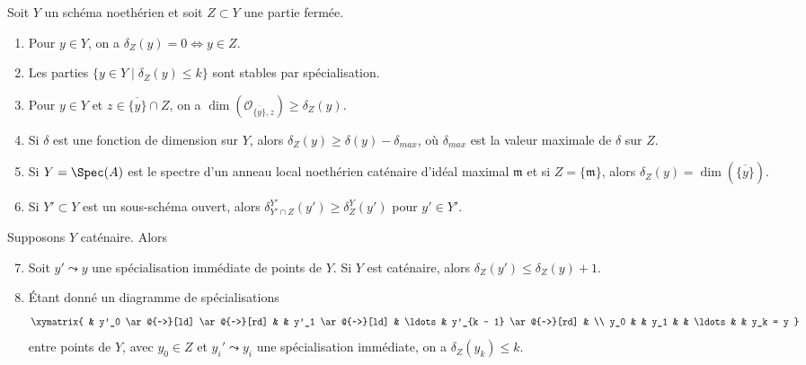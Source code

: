 \begin{lemma}
\label{lemma-discussion}
Soit $Y$ un schéma noethérien et soit $Z \subset Y$ une partie fermée.
\begin{enumerate}
\item Pour $y \in Y$, on a $\delta_Z(y) = 0 \Leftrightarrow y \in Z$.
\item Les parties $\{y \in Y \mid \delta_Z(y) \leq k\}$ sont
stables par spécialisation.
\item Pour $y \in Y$ et $z \in \overline{\{y\}} \cap Z$, on a
$\dim(\mathcal{O}_{\overline{\{y\}}, z}) \geq \delta_Z(y)$.
\item Si $\delta$ est une fonction de dimension sur $Y$, alors
$\delta_Z(y) \geq \delta(y) - \delta_{max}$, où $\delta_{max}$
est la valeur maximale de $\delta$ sur $Z$.
\item Si $Y = \Spec(A)$ est le spectre d'un anneau local noethérien caténaire
d'idéal maximal $\mathfrak m$ et si $Z = \{\mathfrak m\}$, alors
$\delta_Z(y) = \dim(\overline{\{y\}})$.
\item Si $Y' \subset Y$ est un sous-schéma ouvert, alors
$\delta^{Y'}_{Y' \cap Z}(y') \geq \delta^Y_Z(y')$ pour $y' \in Y'$.
\end{enumerate}
Supposons $Y$ caténaire. Alors
\begin{enumerate}
\setcounter{enumi}{6}
\item Soit $y' \leadsto y$ une spécialisation immédiate de points de $Y$.
Si $Y$ est caténaire, alors $\delta_Z(y') \leq \delta_Z(y) + 1$.
\item Étant donné un diagramme de spécialisations
$$
\xymatrix{
& y'_0 \ar@{~>}[ld] \ar@{~>}[rd] &
& y'_1 \ar@{~>}[ld] & \ldots
& y'_{k - 1} \ar@{~>}[rd] &
\\
y_0 & &
y_1 & &
\ldots & &
y_k = y
}
$$
entre points de $Y$, avec $y_0 \in Z$ et $y_i' \leadsto y_i$
une spécialisation immédiate, on a $\delta_Z(y_k) \leq k$.
\end{enumerate}
\end{lemma}

